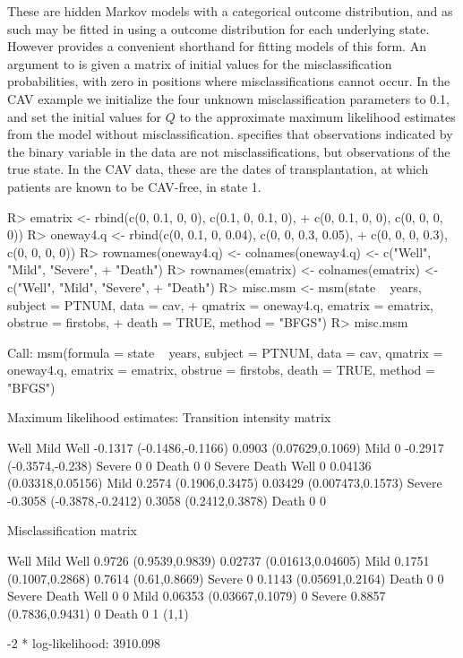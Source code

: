 \documentclass[article,shortnames]{jss}
\begin{document}
These are hidden Markov models with a categorical outcome
distribution, and as such may be fitted in  using a
 outcome distribution for each underlying state.
However  provides a convenient shorthand for fitting models
of this form.  An  argument to  is given a
matrix of initial values for the misclassification probabilities, with
zero in positions where misclassifications cannot occur.  In the CAV
example we initialize the four unknown misclassification parameters to
0.1, and set the initial values  for $Q$ to the
approximate maximum likelihood estimates from the model without
misclassification.   specifies that
observations indicated by the binary variable  in the
data are not misclassifications, but observations of the true state.
In the CAV data, these are the dates of transplantation, at which
patients are known to be CAV-free, in state 1.

\begin{CodeChunk}
\begin{CodeInput}
R> ematrix <- rbind(c(0, 0.1, 0, 0), c(0.1, 0, 0.1, 0),
+    c(0, 0.1, 0, 0), c(0, 0, 0, 0))
R> oneway4.q <- rbind(c(0, 0.1, 0, 0.04), c(0, 0, 0.3, 0.05),
+    c(0, 0, 0, 0.3), c(0, 0, 0, 0))
R> rownames(oneway4.q) <- colnames(oneway4.q) <- c("Well", "Mild", "Severe",
+    "Death")
R> rownames(ematrix) <- colnames(ematrix) <- c("Well", "Mild", "Severe",
+    "Death")
R> misc.msm <- msm(state ~ years, subject = PTNUM, data = cav,
+    qmatrix = oneway4.q, ematrix = ematrix, obstrue = firstobs,
+    death = TRUE, method = "BFGS")
R> misc.msm
\end{CodeInput}

\pagebreak

\begin{CodeOutput}
Call:
msm(formula = state ~ years, subject = PTNUM, data = cav,
    qmatrix = oneway4.q, ematrix = ematrix, obstrue = firstobs, death = TRUE,
    method = "BFGS")

Maximum likelihood estimates:
Transition intensity matrix

       Well                      Mild
Well   -0.1317 (-0.1486,-0.1166) 0.0903 (0.07629,0.1069)
Mild   0                         -0.2917 (-0.3574,-0.238)
Severe 0                         0
Death  0                         0
       Severe                    Death
Well   0                         0.04136 (0.03318,0.05156)
Mild   0.2574 (0.1906,0.3475)    0.03429 (0.007473,0.1573)
Severe -0.3058 (-0.3878,-0.2412) 0.3058 (0.2412,0.3878)
Death  0                         0

Misclassification matrix

       Well                   Mild
Well   0.9726 (0.9539,0.9839) 0.02737 (0.01613,0.04605)
Mild   0.1751 (0.1007,0.2868) 0.7614 (0.61,0.8669)
Severe 0                      0.1143 (0.05691,0.2164)
Death  0                      0
       Severe                   Death
Well   0                        0
Mild   0.06353 (0.03667,0.1079) 0
Severe 0.8857 (0.7836,0.9431)   0
Death  0                        1 (1,1)

-2 * log-likelihood:  3910.098
\end{CodeOutput}
\end{CodeChunk}
\end{document}
